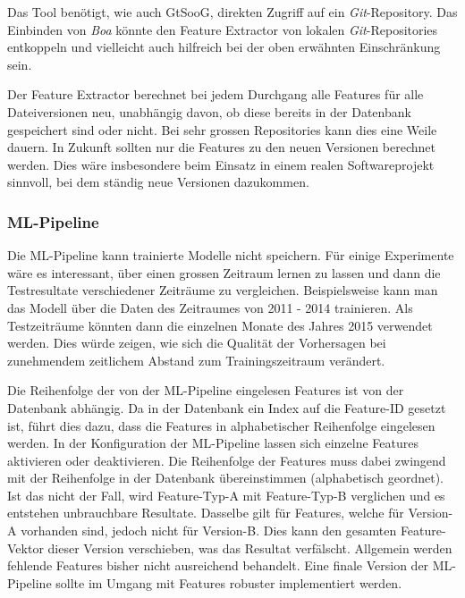 \documentclass[10pt, a4paper]{article}
\begin{document}
Das Tool benötigt, wie auch GtSooG, direkten Zugriff auf ein \emph{Git}-Repository. Das Einbinden von \emph{Boa} könnte den Feature Extractor von lokalen \emph{Git}-Re\-pos\-it\-or\-ies entkoppeln und vielleicht auch hilfreich bei der oben erwähnten Einschränkung sein.

Der Feature Extractor berechnet bei jedem Durchgang alle Features für alle Dateiversionen neu, unabhängig davon, ob diese bereits in der Datenbank gespeichert sind oder nicht. Bei sehr grossen Repositories kann dies eine Weile dauern. In Zukunft sollten nur die Features zu den neuen Versionen berechnet werden. Dies wäre insbesondere beim Einsatz in einem realen Softwareprojekt sinnvoll, bei dem ständig neue Versionen dazukommen.


\subsubsection{ML-Pipeline}

Die ML-Pipeline kann trainierte Modelle nicht speichern. Für einige Experimente wäre es interessant, über einen grossen Zeitraum lernen zu lassen und dann die Testresultate verschiedener Zeiträume zu vergleichen. Beispielsweise kann man das Modell über die Daten des Zeitraumes von 2011 - 2014 trainieren. Als Testzeiträume könnten dann die einzelnen Monate des Jahres 2015 verwendet werden. Dies würde zeigen, wie sich die Qualität der Vorhersagen bei zunehmendem zeitlichem Abstand zum Trainingszeitraum verändert.

Die Reihenfolge der von der ML-Pipeline eingelesen Features ist von der Datenbank abhängig. Da in der Datenbank ein Index auf die Feature-ID gesetzt ist, führt dies dazu, dass die Features in alphabetischer Reihenfolge eingelesen werden. In der Konfiguration der ML-Pipeline lassen sich einzelne Features aktivieren oder deaktivieren. Die Reihenfolge der Features muss dabei zwingend mit der Reihenfolge in der Datenbank übereinstimmen (alphabetisch geordnet). Ist das nicht der Fall, wird Feature-Typ-A mit Feature-Typ-B verglichen und es entstehen unbrauchbare Resultate. Dasselbe gilt für Features, welche für Version-A vorhanden sind, jedoch nicht für Version-B. Dies kann den gesamten Feature-Vektor dieser Version verschieben, was das Resultat verfälscht. Allgemein werden fehlende Features bisher nicht ausreichend behandelt. Eine finale Version der ML-Pipeline sollte im Umgang mit Features robuster implementiert werden.
\end{document}
